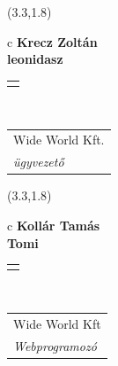 \documentclass[11pt]{article}
\begin{document}
\makebox(3.3,1.8){
  \renewcommand\arraystretch{1.3}
  \begin{tabular}[c]{c}
    \hspace{8.5mm}
    \LARGE\bf{ Krecz Zoltán }\\
    \hspace{8.5mm}
    \Large{ leonidasz }\\
    \renewcommand\arraystretch{3}
    \begin{tabular}[c]{c}
      \centering
      \fontfamily{phv}\selectfont{
        \textbf{
          \textsc{
            \scriptsize{
            \color{Bright}{ Ismerkedő }\color{Dark}{ Webmester }\color{Dark}{ Sminkmester }\color{Bright}{ Programozó }
            }
          }
        }
      }
    \end{tabular}
    \\
    \renewcommand\arraystretch{1}
    \begin{tabular}{p{3.3in}}
      \hspace{.7cm}Wide World Kft.\\
      \hspace{.7cm}\emph{ ügyvezető }\\
    \end{tabular}
  \end{tabular}
}

\makebox(3.3,1.8){
  \renewcommand\arraystretch{1.3}
  \begin{tabular}[c]{c}
    \hspace{8.5mm}
    \LARGE\bf{ Kollár Tamás }\\
    \hspace{8.5mm}
    \Large{ Tomi }\\
    \renewcommand\arraystretch{3}
    \begin{tabular}[c]{c}
      \centering
      \fontfamily{phv}\selectfont{
        \textbf{
          \textsc{
            \scriptsize{
            \color{Bright}{ Ismerkedő }\color{Dark}{ Webmester }\color{Bright}{ Sminkmester }\color{Bright}{ Programozó }
            }
          }
        }
      }
    \end{tabular}
    \\
    \renewcommand\arraystretch{1}
    \begin{tabular}{p{3.3in}}
      \hspace{.7cm}Wide World Kft\\
      \hspace{.7cm}\emph{ Webprogramozó }\\
    \end{tabular}
  \end{tabular}
}
\end{document}
